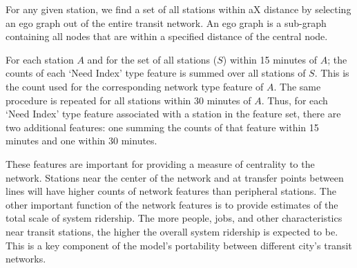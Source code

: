 \documentclass[11pt]{article}
\begin{document}
For any given station, we find a set of all stations within aX distance by selecting an ego graph out of the entire transit network. An ego graph is a sub-graph containing all nodes that are within a specified distance of the central node. 

For each station $A$ and for the set of all stations ($S$) within 15 minutes of $A$; the counts of each `Need Index' type feature is summed over all stations of $S$. This is the count used for the corresponding network type feature of $A$. The same procedure is repeated for all stations within 30 minutes of $A$. Thus, for each `Need Index' type feature associated with a station in the feature set, there are two additional features: one summing the counts of that feature within 15 minutes and one within 30 minutes.

These features are important for providing a measure of centrality to the network. Stations near the center of the network and at transfer points between lines will have higher counts of network features than peripheral stations. The other important function of the network features is to provide estimates of the total scale of system ridership. The more people, jobs, and other characteristics near transit stations, the higher the overall system ridership is expected to be. This is a key component of the model's portability between different city's transit networks. 
\end{document}
